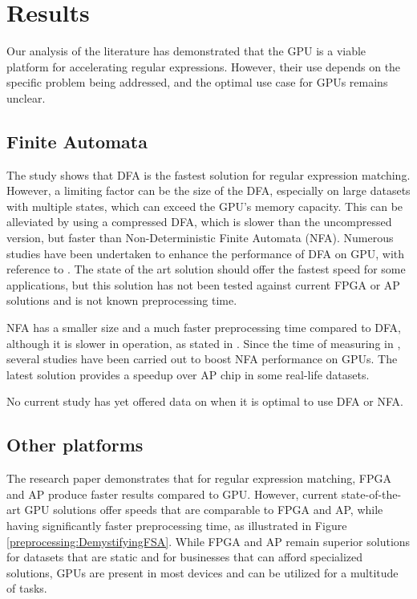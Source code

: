 \documentclass[10pt,onecolumn,twoside,english,a4paper]{article}
\begin{document}
\section{Results} \label{Results}
Our analysis of the literature has demonstrated that the GPU is a viable platform for accelerating regular expressions. However, their use depends on the specific problem being addressed, and the optimal use case for GPUs remains unclear.
\subsection{Finite Automata} \label{Finite Automata:Results}
The study \cite{Becchi:regex_large_dataset} shows that DFA is the fastest solution for regular expression matching. However, a limiting factor can be the size of the DFA, especially on large datasets with multiple states, which can exceed the GPU's memory capacity. This can be alleviated by using a compressed DFA, which is slower than the uncompressed version, but faster than Non-Deterministic Finite Automata (NFA). Numerous studies have been undertaken to enhance the performance of DFA on GPU, with reference to \cite{zhao2015fly,Xia:FSA-scaling,wang2022gspecpal}. The state of the art solution \cite{wang2022gspecpal} should offer the fastest speed for some applications, but this solution has not been tested against current FPGA or AP solutions and is not known preprocessing time.

NFA has a smaller size and a much faster preprocessing time compared to DFA, although it is slower in operation, as stated in \cite{Nourian:DemystifyingFSA}. Since the time of measuring in \cite{Becchi:regex_large_dataset}, several studies \cite{Liu:WhyGPUSlowNFA,Liu:Asynchronous} have been carried out to boost NFA performance on GPUs. The latest solution \cite{Liu:Asynchronous} provides a speedup over AP chip in some real-life datasets.

No current study has yet offered data on when it is optimal to use DFA or NFA.

\subsection{Other platforms} \label{Other platforms:Results}
The research paper \cite{Nourian:DemystifyingFSA} demonstrates that for regular expression matching, FPGA and AP produce faster results compared to GPU. However, current state-of-the-art GPU solutions offer speeds that are comparable to FPGA and AP, while having significantly faster preprocessing time, as illustrated in Figure \ref{preprocessing:DemystifyingFSA}. While FPGA and AP remain superior solutions for datasets that are static and for businesses that can afford specialized solutions, GPUs are present in most devices and can be utilized for a multitude of tasks.
\end{document}
